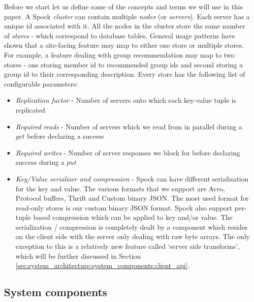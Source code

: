 \documentclass[twocolumn]{article}
\newcommand{\projectname}{Spock}
\begin{document}
Before we start let us define some of the concepts and terms we will use in this paper. A \projectname{} \emph{cluster} can contain multiple \emph{nodes} (or \emph{servers}). Each server has a unique id associated with it. All the nodes in the cluster store the same number of \emph{stores} - which correspond to database tables. General usage patterns have shown that a site-facing feature may map to either one store or multiple stores. For example, a feature dealing with group recommendation may map to two stores - one storing member id to recommended group ids and second storing a group id to their corresponding description. Every store has the following list of configurable parameters:
\begin{itemize}
	\item \emph {Replication factor} - Number of servers onto which each key-value tuple is replicated
	\item \emph {Required reads} - Number of servers which we read from in parallel during a $get$ before declaring a success
	\item \emph {Required writes} - Number of server responses we block for before declaring success during a $put$
	\item \emph {Key/Value serializer and compression} - \projectname{} can have different serialization for the key and value. The various formats that we support are Avro, Protocol buffers, Thrift and Custom binary JSON. The most used format for read-only stores is our custom binary JSON format. \projectname{} also support per-tuple based compression which can be applied to key and/or value. The serialization / compression is completely dealt by a component which resides on the client side with the server only dealing with raw byte arrays. The only exception to this is a relatively new feature called `server side transforms', which will be further discussed in Section \ref{sec:system_architecture:system_components:client_api}. 
\end{itemize}



\subsection{System components}
\label{sec:system_architecture:system_components}
\end{document}
